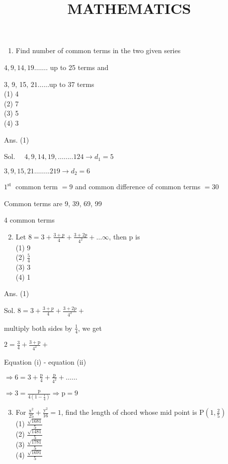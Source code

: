 \documentclass[10pt]{article}
\title{MATHEMATICS }
\author{}
\date{}
\begin{document}
\maketitle
\begin{enumerate}
  \item Find number of common terms in the two given series
\end{enumerate}

$4,9,14,19 \ldots \ldots$. up to 25 terms and

3, 9, 15, $21 \ldots$...up to 37 terms\\
(1) 4\\
(2) 7\\
(3) 5\\
(4) 3

Ans. (1)

Sol. $\quad 4,9,14,19, \ldots \ldots . .124 \rightarrow d_{1}=5$

$3,9,15,21 \ldots \ldots . .219 \rightarrow d_{2}=6$

$1^{\text {st }}$ common term $=9$ and common difference of common terms $=30$

Common terms are 9, 39, 69, 99

4 common terms

\begin{enumerate}
  \setcounter{enumi}{1}
  \item Let $8=3+\frac{3+p}{4}+\frac{3+2 p}{4^{2}}+\ldots \infty$, then $\mathrm{p}$ is\\
(1) 9\\
(2) $\frac{5}{4}$\\
(3) 3\\
(4) 1
\end{enumerate}

Ans. (1)

Sol. $8=3+\frac{3+p}{4}+\frac{3+2 p}{4^{2}}+$

multiply both sides by $\frac{1}{4}$, we get

$2=\frac{3}{4}+\frac{3+\mathrm{p}}{4^{2}}+$

Equation (i) - equation (ii)

$\Rightarrow 6=3+\frac{\mathrm{p}}{4}+\frac{\mathrm{p}}{4^{2}}+\ldots \ldots$

$\Rightarrow 3=\frac{\mathrm{p}}{4\left(1-\frac{1}{4}\right)} \Rightarrow \mathrm{p}=9$

\begin{enumerate}
  \setcounter{enumi}{2}
  \item For $\frac{\mathrm{x}^{2}}{25}+\frac{\mathrm{y}^{2}}{16}=1$, find the length of chord whose mid point is $\mathrm{P}\left(1, \frac{2}{5}\right)$\\
(1) $\frac{\sqrt{1681}}{5}$\\
(2) $\frac{\sqrt{1481}}{5}$\\
(3) $\frac{\sqrt{1781}}{5}$\\
(4) $\frac{\sqrt{1691}}{5}$
\end{enumerate}
\end{document}
